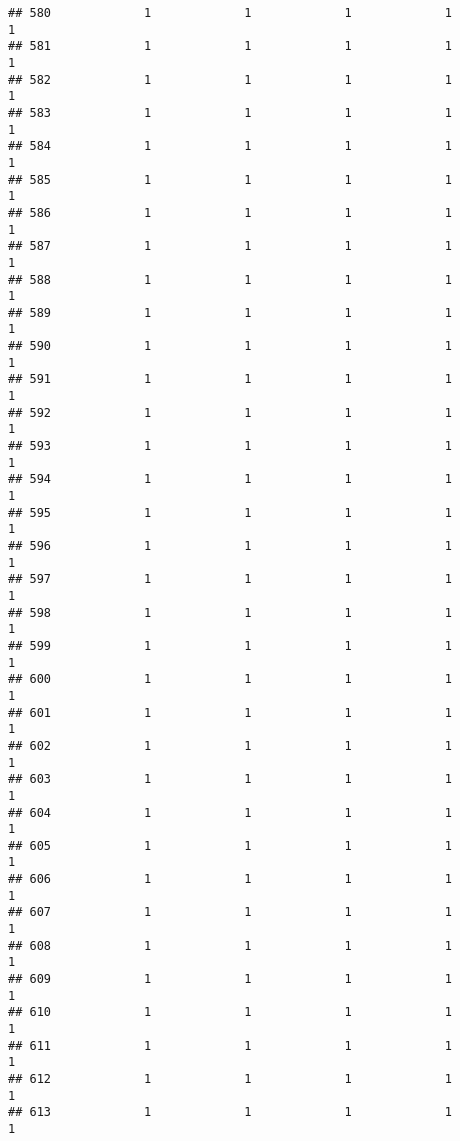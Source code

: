 \documentclass[
]{article}
\begin{document}
\begin{verbatim}
## 580             1             1             1             1             1
## 581             1             1             1             1             1
## 582             1             1             1             1             1
## 583             1             1             1             1             1
## 584             1             1             1             1             1
## 585             1             1             1             1             1
## 586             1             1             1             1             1
## 587             1             1             1             1             1
## 588             1             1             1             1             1
## 589             1             1             1             1             1
## 590             1             1             1             1             1
## 591             1             1             1             1             1
## 592             1             1             1             1             1
## 593             1             1             1             1             1
## 594             1             1             1             1             1
## 595             1             1             1             1             1
## 596             1             1             1             1             1
## 597             1             1             1             1             1
## 598             1             1             1             1             1
## 599             1             1             1             1             1
## 600             1             1             1             1             1
## 601             1             1             1             1             1
## 602             1             1             1             1             1
## 603             1             1             1             1             1
## 604             1             1             1             1             1
## 605             1             1             1             1             1
## 606             1             1             1             1             1
## 607             1             1             1             1             1
## 608             1             1             1             1             1
## 609             1             1             1             1             1
## 610             1             1             1             1             1
## 611             1             1             1             1             1
## 612             1             1             1             1             1
## 613             1             1             1             1             1

\end{verbatim}
\end{document}
